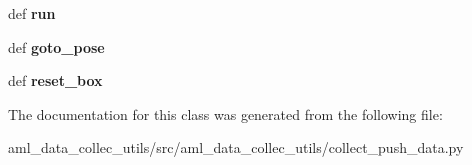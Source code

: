 \begin{DoxyCompactItemize}
\item 
\hypertarget{classaml__data__collec__utils_1_1collect__push__data_1_1_push_machine_a4ceafe8e66ec8cad8d63f5504191415e}{def {\bfseries run}}\label{classaml__data__collec__utils_1_1collect__push__data_1_1_push_machine_a4ceafe8e66ec8cad8d63f5504191415e}

\item 
\hypertarget{classaml__data__collec__utils_1_1collect__push__data_1_1_push_machine_a91a21027bc9878d464767362ddf811d0}{def {\bfseries goto\-\_\-pose}}\label{classaml__data__collec__utils_1_1collect__push__data_1_1_push_machine_a91a21027bc9878d464767362ddf811d0}

\item 
\hypertarget{classaml__data__collec__utils_1_1collect__push__data_1_1_push_machine_a74d964fc2ef545e29368d29b04bdc13e}{def {\bfseries reset\-\_\-box}}\label{classaml__data__collec__utils_1_1collect__push__data_1_1_push_machine_a74d964fc2ef545e29368d29b04bdc13e}

\end{DoxyCompactItemize}


The documentation for this class was generated from the following file\-:\begin{DoxyCompactItemize}
\item 
aml\-\_\-data\-\_\-collec\-\_\-utils/src/aml\-\_\-data\-\_\-collec\-\_\-utils/collect\-\_\-push\-\_\-data.\-py\end{DoxyCompactItemize}
